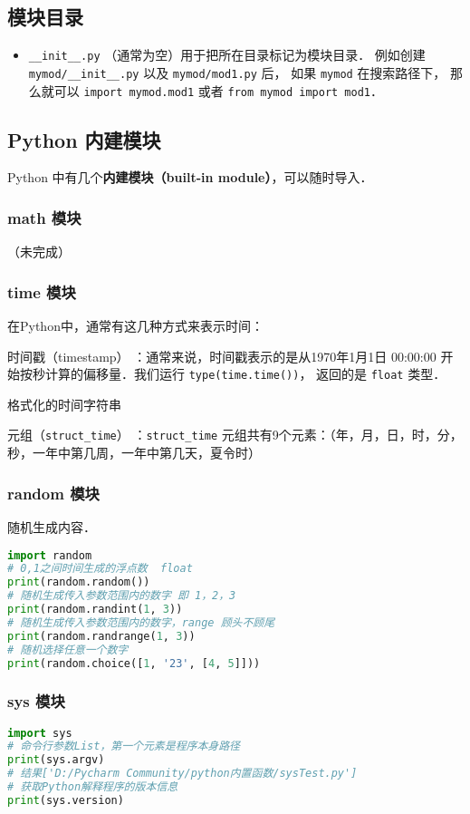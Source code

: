 \subsection{模块目录}
\begin{itemize}
\item \verb|__init__.py| （通常为空）用于把所在目录标记为模块目录． 例如创建 \verb|mymod/__init__.py| 以及 \verb|mymod/mod1.py| 后， 如果 \verb|mymod| 在搜索路径下， 那么就可以 \verb|import mymod.mod1| 或者 \verb|from mymod import mod1|．
\end{itemize}

\subsection{Python 内建模块}
Python 中有几个\textbf{内建模块（built-in module）}，可以随时导入．

\subsubsection{math 模块}
（未完成）

\subsubsection{time 模块}
在Python中，通常有这几种方式来表示时间：

时间戳（timestamp） ：通常来说，时间戳表示的是从1970年1月1日 00:00:00 开始按秒计算的偏移量．我们运行 \verb|type(time.time())|， 返回的是 \verb|float| 类型．

格式化的时间字符串

元组（\verb|struct_time|） ：\verb|struct_time| 元组共有9个元素：（年，月，日，时，分，秒，一年中第几周，一年中第几天，夏令时）

\subsubsection{random 模块}
随机生成内容．
\begin{lstlisting}[language=python]
import random
# 0,1之间时间生成的浮点数  float
print(random.random())
# 随机生成传入参数范围内的数字 即 1，2，3
print(random.randint(1, 3))
# 随机生成传入参数范围内的数字，range 顾头不顾尾
print(random.randrange(1, 3))
# 随机选择任意一个数字
print(random.choice([1, '23', [4, 5]]))
\end{lstlisting}

\subsubsection{sys 模块}
\begin{lstlisting}[language=python]
import sys
# 命令行参数List，第一个元素是程序本身路径
print(sys.argv)
# 结果['D:/Pycharm Community/python内置函数/sysTest.py']
# 获取Python解释程序的版本信息
print(sys.version)
\end{lstlisting}

